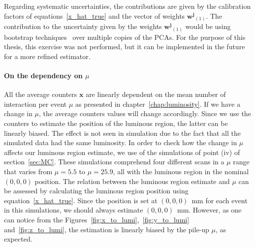 Regarding systematic uncertainties, the contributions are given by the calibration factors of equations~\eqref{x_hat_true} and the vector of weights $\mathbf{w^j}_{(1)}$. 
The contribution to the uncertainty given by the weights $\mathbf{w^j}_{(1)}$ would be using bootstrap techniques~\cite{10.1214/aos/1176344552} over multiple copies of the PCAs.
For the purpose of this thesis, this exercise was not performed, but it can be implemented in the future for a more refined estimator.


\paragraph{On the dependency on $\mu$}\label{sec:mu_dependency}
All the average counters $\mathbf{x}$ are linearly dependent on the mean number of interaction per event $\mu$ as presented in chapter~\ref{chap:luminosity}. If we have a change in $\mu$, the average counters values will change accordingly. Since we use the counters to estimate the position of the luminous region, the latter can be linearly biased. The effect is not seen in simulation due to the fact that all the simulated data had the same luminosity. In order to check how the change in $\mu$ affects our luminous region estimate, we  use of the simulations of point (iv) of section~\ref{sec:MC}. These simulations comprehend four different scans in a $\mu$ range that varies from $\mu=5.5$ to $\mu=25.9$, all with the luminous region in the nominal $(0,0,0)$ position. 
The relation between the luminous region estimate and $\mu$ can be assessed by calculating the luminous region position using equation~\eqref{x_hat_true}. Since the position is set at $(0,0,0)$~mm for each event in this simulations, we should always estimate $(0,0,0)$~mm. However, as one can notice from the Figures~\ref{fig:x_to_lumi},~\ref{fig:y_to_lumi} and~\ref{fig:z_to_lumi}, the estimation is linearly biased by the pile-up $\mu$, as expected. 
